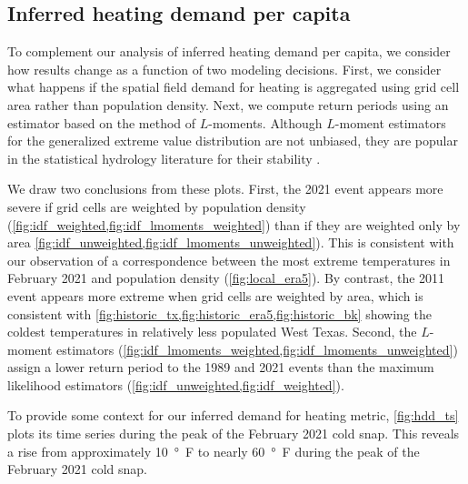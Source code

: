 \documentclass[12pt]{iopart}
\begin{document}
\subsection{Inferred heating demand per capita}

To complement our analysis of inferred heating demand per capita, we consider how results change as a function of two modeling decisions.
First, we consider what happens if the spatial field demand for heating is aggregated using grid cell area rather than population density.
Next, we compute return periods using an estimator based on the method of $L$-moments.
Although $L$-moment estimators for the generalized extreme value distribution are not unbiased, they are popular in the statistical hydrology literature for their stability \cite{hosking_gev:1985,martins_gev:2001,morrison_gev:2002}.

We draw two conclusions from these plots.
First, the 2021 event appears more severe if grid cells are weighted by population density (\cref{fig:idf_weighted,fig:idf_lmoments_weighted}) than if they are weighted only by area \cref{fig:idf_unweighted,fig:idf_lmoments_unweighted}).
This is consistent with our observation of a correspondence between the most extreme temperatures in February 2021 and population density (\cref{fig:local_era5}).
By contrast, the 2011 event appears more extreme when grid cells are weighted by area, which is consistent with \cref{fig:historic_tx,fig:historic_era5,fig:historic_bk} showing the coldest temperatures in relatively less populated West Texas.
Second, the $L$-moment estimators (\cref{fig:idf_lmoments_weighted,fig:idf_lmoments_unweighted}) assign a lower return period to the 1989 and 2021 events than the maximum likelihood estimators (\cref{fig:idf_unweighted,fig:idf_weighted}).

To provide some context for our inferred demand for heating metric, \cref{fig:hdd_ts} plots its time series during the peak of the February 2021 cold snap.
This reveals a rise from approximately \SI{10}{\degree F} to nearly \SI{60}{\degree F} during the peak of the February 2021 cold snap.
\end{document}
